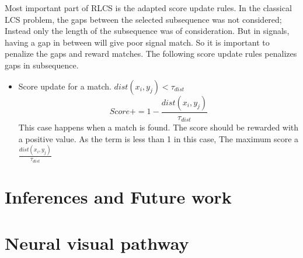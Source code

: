 \documentclass[MTech]{iitmdiss}
\begin{document}
Most important part of RLCS is the adapted score update rules. In the classical LCS problem, the gaps between the selected subsequence was not considered; Instead only the length of the subsequence was of consideration. But in signals, having a gap in between will give poor signal match. So it is important to penalize the gaps and reward matches.
The following score update rules penalizes gaps in subsequence.
\begin{itemize}
  \item Score update for a match. $dist(x_i, y_j) < \tau_{dist}$\\
  $$Score += 1 - \frac{dist(x_i, y_j)}{\tau_{dist}}$$
  This case happens when a match is found. The score should be rewarded with a positive value.  As the term is less than 1 in this case, The maximum score a$\frac{dist(x_i, y_j)}{\tau_{dist}}$
\end{itemize}

\chapter{Inferences and Future work}    %
\label{chap:summary}

\appendix
\chapter{Neural visual pathway}

\pagebreak
\begin{singlespace}
  \begin{small}
	
  \end{small}
\end{singlespace}
\end{document}
